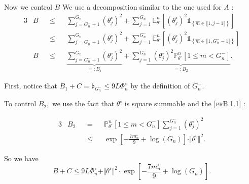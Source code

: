 Now we control $B$ We use a decomposition similar to the one used for $A$ :
\begin{alignat*}{3}
& B && \leq && \sum\limits_{j = G_{n}^{-} + 1}^{G_{n}} \left(\theta^{\circ}_{j}\right)^{2} + \sum\limits_{j = 1}^{G_{n}^{-}} \mathds{E}_{\theta^{\circ}}^{n}\left[\left(\theta^{\circ}_{j}\right)^{2} \mathds{1}_{\left\{\widehat{m} \in \llbracket 1, j - 1 \rrbracket\right\}}\right]\\
& && \leq && \sum\limits_{j = G_{n}^{-} + 1}^{G_{n}} \left(\theta^{\circ}_{j} \right)^{2} + \sum\limits_{j = 1}^{G_{n}^{-}} \mathds{E}_{\theta^{\circ}}^{n}\left[\left(\theta^{\circ}_{j}\right)^{2} \mathds{1}_{\left\{\widehat{m} \in \llbracket 1, G_{n}^{-} - 1 \rrbracket\right\}}\right]\\
& B && \leq && \underbrace{\sum\limits_{j = G_{n}^{-} + 1}^{G_{n}} \left(\theta^{\circ}_{j}\right)^{2}}_{=: B_{1}} + \underbrace{\sum\limits_{j = 1}^{G_{n}^{-}} \left(\theta^{\circ}_{j}\right)^{2} \mathds{P}_{\theta^{\circ}}^{n}\left[1 \leq \widehat{m} < G_{n}^{-}\right]}_{=: B_{2}}.
\end{alignat*}

\medskip

First, notice that $B_{1} + C = \mathfrak{b}_{G_{n}^{-}} \leq 9 L \Phi_{n}^{\circ}$ by the definition of $G_{n}^{-}.$

\medskip

To control $B_{2},$ we use the fact that $\theta^{\circ}$ is square summable and the \textsc{\cref{prB.1.1}} :
 
\begin{alignat*}{3}
& B_{2} &&=&& \mathds{P}_{\theta^{\circ}}^{n}\left[1 \leq \widehat{m} < G_{n}^{-}\right] \sum\limits_{j = 1}^{G_{n}^{-}} \left(\theta^{\circ}_{j}\right)^{2} \\
& &&\leq&& \exp\left[-\frac{7 m_{n}^{\circ}}{9} + \log\left(G_{n}\right)\right] \cdot \Vert \theta^{\circ} \Vert^{2}.
 \end{alignat*}

\medskip

So we have
\[B + C \leq 9 L \Phi_{n}^{\circ} + \Vert \theta^{\circ} \Vert^{2} \cdot \exp\left[-\frac{7 m_{n}^{\circ}}{9} + \log\left(G_{n}\right)\right].\]

